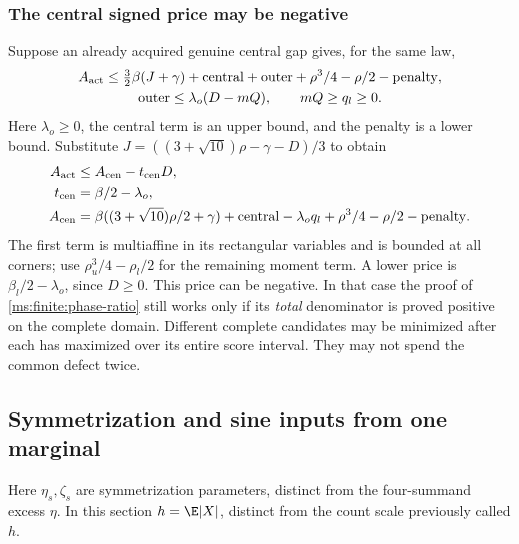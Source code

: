\subsubsection{The central signed price may be negative}
Suppose an already acquired genuine central gap gives, for the same law,
\[
 \begin{gathered}
 A_{\rm act}\le\tfrac32\beta(J+\gamma)+\mathrm{central}
 +\mathrm{outer}+\rho^3/4-\rho/2-\mathrm{penalty},\\
 \mathrm{outer}\le\lambda_o(D-mQ),\qquad mQ\ge q_l\ge0.
 \end{gathered}
\]
Here $\lambda_o\ge0$, the central term is an upper bound, and the
penalty is a lower bound. Substitute
$J=((3+\sqrt{10})\rho-\gamma-D)/3$ to obtain
\begin{align}
 A_{\rm act}&\le A_{\rm cen}-t_{\rm cen}D,\notag\\
 t_{\rm cen}&=\beta/2-\lambda_o,\notag\\
 A_{\rm cen}&=\beta((3+\sqrt{10})\rho/2+\gamma)
  +\mathrm{central}-\lambda_oq_l+\rho^3/4-\rho/2-\mathrm{penalty}.
 \label{ms:finite:central-price}
\end{align}
The first term is multiaffine in its rectangular variables and is
bounded at all corners; use $\rho_u^3/4-\rho_l/2$ for the remaining
moment term. A lower price is $\beta_l/2-\lambda_o$, since $D\ge0$.
This price can be negative. In that case the proof of
\eqref{ms:finite:phase-ratio} still works only if its \emph{total}
denominator is proved positive on the complete domain. Different
complete candidates may be minimized after each has maximized over
its entire score interval. They may not spend the common defect twice.


\subsection{Symmetrization and sine inputs from one marginal}
\label{ms:finite:symmetrization}
Here $\eta_s,\zeta_s$ are symmetrization parameters, distinct from the
four-summand excess $\eta$. In this section $h=\E|X|$, distinct from
the count scale previously called $h$.

